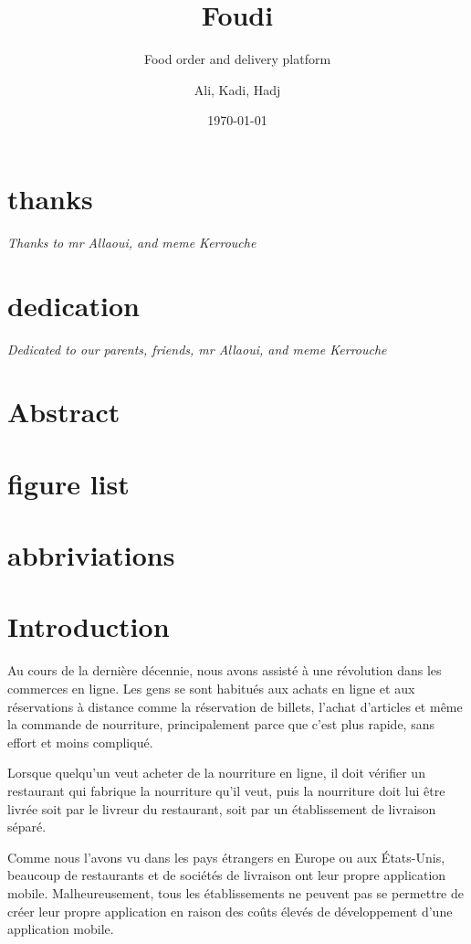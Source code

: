 \documentclass[a4paper, 10p]{report}
\title{\textbf{Foudi}}
\subtitle{Food order and delivery platform}
\author{Ali, Kadi, Hadj}
\date{\today}
\begin{document}
\maketitle

\chapter*{thanks}
\Large \emph\textit{{Thanks to mr Allaoui, and meme Kerrouche}}

\chapter*{dedication}
\Large \emph\textit{{Dedicated to our parents, friends, mr Allaoui, and meme Kerrouche}}

\newpage
\chapter*{Abstract}


\tableofcontents

\newpage
\chapter*{figure list}

\newpage
\chapter*{abbriviations}


\newpage
\chapter*{Introduction}
    Au cours de la dernière décennie, nous avons assisté à une révolution dans les commerces en ligne. Les gens se sont habitués aux achats en ligne et aux réservations à distance comme la réservation de billets, l'achat d'articles et même la commande de nourriture, principalement parce que c'est plus rapide, sans effort et moins compliqué.

Lorsque quelqu'un veut acheter de la nourriture en ligne, il doit vérifier un restaurant qui fabrique la nourriture qu'il veut, puis la nourriture doit lui être livrée soit par le livreur du restaurant, soit par un établissement de livraison séparé.

Comme nous l'avons vu dans les pays étrangers en Europe ou aux États-Unis, beaucoup de restaurants et de sociétés de livraison ont leur propre application mobile. Malheureusement, tous les établissements ne peuvent pas se permettre de créer leur propre application en raison des coûts élevés de développement d'une application mobile.
\end{document}
